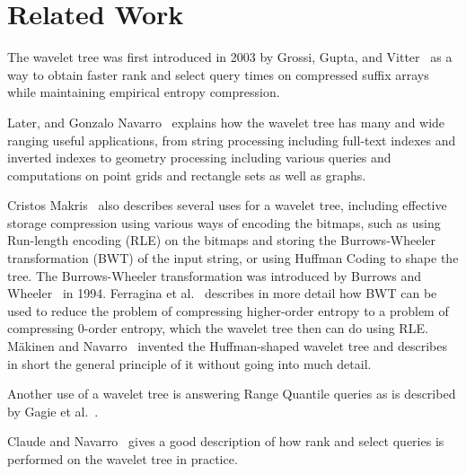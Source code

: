 \section{Related Work}
The wavelet tree was first introduced in 2003 by Grossi, Gupta, and Vitter~\cite[Section 4.2]{Grossi:2003:HET:644108.644250} as a way to obtain faster rank and select query times on compressed suffix arrays while maintaining empirical entropy compression.

Later, and Gonzalo Navarro~\cite{Navjda13} explains how the wavelet tree has many and wide ranging useful applications, from string processing including full-text indexes and inverted indexes to geometry processing including various queries and computations on point grids and rectangle sets as well as graphs.

Cristos Makris~\citep{WTSurvey} also describes several uses for a wavelet tree, including effective storage compression using various ways of encoding the bitmaps, such as using Run-length encoding (RLE) on the bitmaps and storing the Burrows-Wheeler transformation (BWT) of the input string, or using Huffman Coding to shape the tree.
The Burrows-Wheeler transformation was introduced by Burrows and Wheeler~\citep{BWToriginalArticle} in 1994.
Ferragina et al.~\citep{waveletTreeEntropy} describes in more detail how BWT can be used to reduce the problem of compressing higher-order entropy to a problem of compressing 0-order entropy, which the wavelet tree then can do using RLE.
Mäkinen and Navarro~\citep[Section~4]{FMcountOnBWT} invented the Huffman-shaped wavelet tree and describes in short the general principle of it without going into much detail.

Another use of a wavelet tree is answering Range Quantile queries as is described by Gagie et al.~\citep[Section 3]{RangeQuantileQueries}.

Claude and Navarro~\citep[Section~2.2]{Claude08practicalrankselect} gives a good description of how rank and select queries is performed on the wavelet tree in practice.